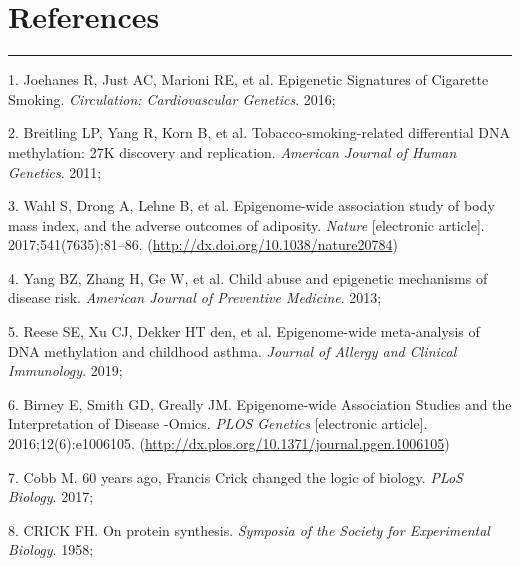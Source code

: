 \documentclass[11pt,twoside]{bristolthesis}
\newenvironment{cslreferences}%
  {}%
  {\par}
\begin{document}
\hypertarget{references}{%
\chapter*{References}\label{references}}


\noindent

\setlength{\parindent}{-0.20in}
\setlength{\leftskip}{0.20in}
\setlength{\parskip}{8pt}
\begin{center}\rule{0.5\linewidth}{0.5pt}\end{center}

\hypertarget{refs}{}
\begin{cslreferences}
\leavevmode\hypertarget{ref-Joehanes2016}{}%
1. Joehanes R, Just AC, Marioni RE, et al. Epigenetic Signatures of Cigarette Smoking. \emph{Circulation: Cardiovascular Genetics}. 2016;

\leavevmode\hypertarget{ref-Breitling2011}{}%
2. Breitling LP, Yang R, Korn B, et al. Tobacco-smoking-related differential DNA methylation: 27K discovery and replication. \emph{American Journal of Human Genetics}. 2011;

\leavevmode\hypertarget{ref-Wahl2017}{}%
3. Wahl S, Drong A, Lehne B, et al. Epigenome-wide association study of body mass index, and the adverse outcomes of adiposity. \emph{Nature} {[}electronic article{]}. 2017;541(7635):81--86. (\url{http://dx.doi.org/10.1038/nature20784})

\leavevmode\hypertarget{ref-Yang2013}{}%
4. Yang BZ, Zhang H, Ge W, et al. Child abuse and epigenetic mechanisms of disease risk. \emph{American Journal of Preventive Medicine}. 2013;

\leavevmode\hypertarget{ref-Reese2019}{}%
5. Reese SE, Xu CJ, Dekker HT den, et al. Epigenome-wide meta-analysis of DNA methylation and childhood asthma. \emph{Journal of Allergy and Clinical Immunology}. 2019;

\leavevmode\hypertarget{ref-Birney2016}{}%
6. Birney E, Smith GD, Greally JM. Epigenome-wide Association Studies and the Interpretation of Disease -Omics. \emph{PLOS Genetics} {[}electronic article{]}. 2016;12(6):e1006105. (\url{http://dx.plos.org/10.1371/journal.pgen.1006105})

\leavevmode\hypertarget{ref-Cobb2017}{}%
7. Cobb M. 60 years ago, Francis Crick changed the logic of biology. \emph{PLoS Biology}. 2017;

\leavevmode\hypertarget{ref-CRICK1958}{}%
8. CRICK FH. On protein synthesis. \emph{Symposia of the Society for Experimental Biology}. 1958;


\end{cslreferences}
\end{document}

